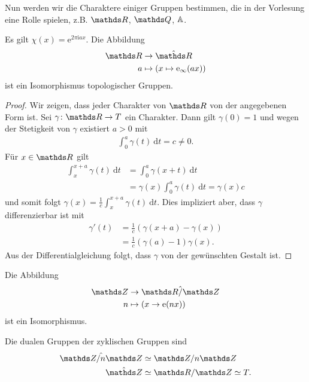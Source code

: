 Nun werden wir die Charaktere einiger Gruppen bestimmen, die in der Vorlesung eine Rolle spielen, z.B. $\R$, $\Q$, $\mathbb{A}$.

\begin{prop}
Es gilt $\chi(x)=\mathrm{e}^{2\pi \mathrm{i}a x}$.
Die Abbildung
\begin{align*}
\R &\to \hat{\R}\\
a&\mapsto (x\mapsto \mathrm{e}_\infty(ax))
\end{align*}
ist ein Isomorphismus topologischer Gruppen.
\end{prop}
\begin{proof}
Wir zeigen, dass jeder Charakter von $\R$ von der angegebenen Form ist.
Sei $\gamma \colon \R \to T$ ein Charakter. Dann gilt $\gamma(0)=1$ und wegen der Stetigkeit von $\gamma$ existiert $a>0$ mit
\begin{align*}
\int_0^a \gamma(t)~\mathrm{d}t=c\not =0.
\end{align*}
Für $x\in \R$ gilt
\begin{align*}
\int_x^{x+a}\gamma(t)~\mathrm{d}t&= \int_0^a\gamma(x+t)~\mathrm{d}t\\
&=\gamma(x)\int_0^a \gamma(t)~\mathrm{d}t=\gamma(x)c
\end{align*}
und somit folgt $\gamma(x)=\frac{1}{c}\int_x^{x+a} \gamma(t)~\mathrm{d}t$.
Dies impliziert aber, dass $\gamma$ differenzierbar ist mit
\begin{align*}
\gamma'(t)&=\frac{1}{c}\left(\gamma(x+a)-\gamma(x)\right)\\
&= \frac{1}{c}(\gamma(a)-1)\gamma(x).
\end{align*}
Aus der Differentialgleichung folgt, dass $\gamma$ von der gewünschten Gestalt ist.
\end{proof}

\begin{prop}
Die Abbildung
\begin{align*}
\Z &\to \hat{\R/\Z}\\
n &\mapsto (x \to \mathrm{e} (nx))
\end{align*}
ist ein Isomorphismus.
\end{prop}

\begin{prop}
Die dualen Gruppen der zyklischen Gruppen sind
\begin{align*}
\hat{\Z/n\Z} &\simeq \Z/n\Z\\
\hat{\Z} &\simeq \R/\Z \simeq T.
\end{align*}
\end{prop}

